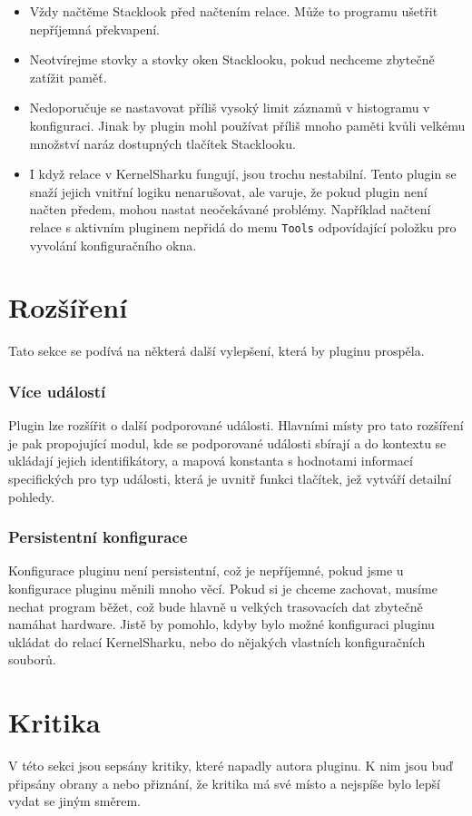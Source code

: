 \begin{itemize}
  \item Vždy načtěme Stacklook před načtením relace. Může to programu ušetřit nepříjemná překvapení.
  \item Neotvírejme stovky a stovky oken Stacklooku, pokud nechceme zbytečně zatížit paměť.
  \item Nedoporučuje se nastavovat příliš vysoký limit záznamů v histogramu v konfiguraci. Jinak by plugin mohl používat příliš mnoho paměti kvůli velkému množství naráz dostupných tlačítek Stacklooku.
  \item I když relace v KernelSharku fungují, jsou trochu nestabilní. Tento plugin se snaží jejich vnitřní logiku nenarušovat, ale varuje, že pokud plugin není načten předem, mohou nastat neočekávané problémy. Například načtení relace s aktivním pluginem nepřidá do menu \texttt{Tools} odpovídající položku pro vyvolání konfiguračního okna.
\end{itemize}

\section{Rozšíření}
Tato sekce se podívá na některá další vylepšení, která by pluginu prospěla.

\subsubsection*{Více událostí}
Plugin lze rozšířit o další podporované události. Hlavními místy pro tato rozšíření je pak propojující modul, kde se podporované události sbírají a do kontextu se ukládají jejich identifikátory, a mapová konstanta s hodnotami informací specifických pro typ události, která je uvnitř funkci tlačítek, jež vytváří detailní pohledy.

\subsubsection*{Persistentní konfigurace}
Konfigurace pluginu není persistentní, což je nepříjemné, pokud jsme u konfigurace pluginu měnili mnoho věcí. Pokud si je chceme zachovat, musíme nechat program běžet, což bude hlavně u velkých trasovacích dat zbytečně namáhat hardware. Jistě by pomohlo, kdyby bylo možné konfiguraci pluginu ukládat do relací KernelSharku, nebo do nějakých vlastních konfiguračních souborů.

\section{Kritika}
V této sekci jsou sepsány kritiky, které napadly autora pluginu. K nim jsou buď připsány obrany a nebo přiznání, že kritika má své místo a nejspíše bylo lepší vydat se jiným směrem.

